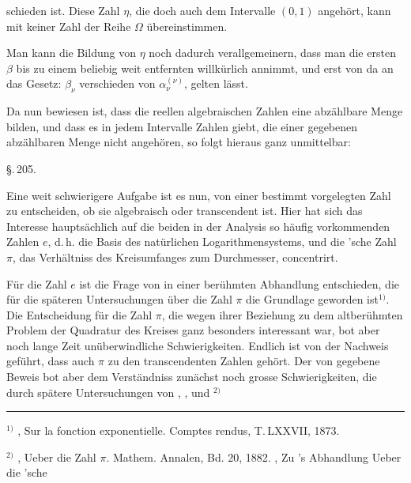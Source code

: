 
schieden ist. Diese Zahl $\eta$, die doch auch dem Intervalle $(0, 1)$ angeh\"ort, kann mit keiner Zahl der Reihe $\Omega$ \"ubereinstimmen.

Man kann die Bildung von $\eta$ noch dadurch verallgemeinern, dass man die ersten $\beta$ bis zu einem beliebig weit entfernten willk\"urlich annimmt, und erst von da an das Gesetz: $\beta_\nu$ verschieden von $\alpha_\nu^{(\nu)}$, gelten l\"asst.

Da nun bewiesen ist, dass die reellen algebraischen Zahlen eine abz\"ahlbare Menge bilden, und dass es in jedem Intervalle Zahlen giebt, die einer gegebenen abz\"ahlbaren Menge nicht angeh\"oren, so folgt hieraus ganz unmittelbar:

\begin{center}
\end{center}

\begin{center}
\S.\,205.

\end{center}

Eine weit schwierigere Aufgabe ist es nun, von einer bestimmt vorgelegten Zahl zu entscheiden, ob sie algebraisch oder transcendent ist. Hier hat sich das Interesse haupts\"achlich auf die beiden in der Analysis so h\"aufig vorkommenden Zahlen $e$, d.\,h. die Basis des nat\"urlichen Logarithmensystems, und die 'sche Zahl $\pi$, das Verh\"altniss des Kreisumfanges zum Durchmesser, concentrirt.

F\"ur die Zahl $e$ ist die Frage von  in einer ber\"uhmten Abhandlung entschieden, die f\"ur die sp\"ateren Untersuchungen \"uber die Zahl $\pi$ die Grundlage geworden ist$^{1)}$. Die Entscheidung f\"ur die Zahl $\pi$, die wegen ihrer Beziehung zu dem altber\"uhmten Problem der Quadratur des Kreises ganz besonders interessant war, bot aber noch lange Zeit un\"uberwindliche Schwierigkeiten. Endlich ist von  der Nachweis gef\"uhrt, dass auch $\pi$ zu den transcendenten Zahlen geh\"ort. Der von  gegebene Beweis bot aber dem Verst\"andniss zun\"achst noch grosse Schwierigkeiten, die durch sp\"atere Untersuchungen von , ,  und $^{2)}$

\noindent\rule{4cm}{0.4pt}

$^{1)}$ , Sur la fonction exponentielle. Comptes rendus, T.\,LXXVII, 1873.

$^{2)}$ , Ueber die Zahl $\pi$. Mathem. Annalen, Bd. 20, 1882. , Zu 's Abhandlung \glqq Ueber die 'sche
